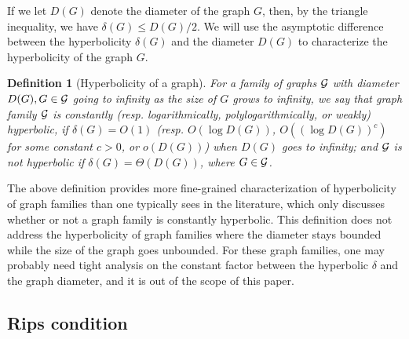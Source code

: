 \documentclass[11pt]{article}
\newtheorem{defi}{Definition}
\begin{document}
If we let $D(G)$ denote the diameter of the graph $G$, then, by the triangle 
inequality, we have $\delta(G) \le D(G)/2$.
We will use the asymptotic difference between the hyperbolicity $\delta(G)$ 
and the diameter $D(G)$ to characterize the hyperbolicity of the graph $G$.
\begin{defi}[Hyperbolicity of a graph]
For a family of graphs $\cal G$ with diameter $D(G), G\in {\cal G}$ going to infinity as the size of $G$ grows to infinity, we say 
that graph family $\cal G$ is
{\em constantly (resp. logarithmically, polylogarithmically, or weakly) hyperbolic}, 
	if $\delta(G) = O(1)$ (resp. $O(\log D(G))$, $O((\log D(G))^c)$ for some constant $c>0$, 
	or $o(D(G))$) when $D(G)$ goes to infinity; and 
	$\cal G$ is {\em not hyperbolic} if $\delta(G) = \Theta(D(G))$, where $G\in {\cal G}$.
\end{defi}


\noindent
The above definition provides more fine-grained characterization of hyperbolicity of graph families
	than one typically sees in the literature, which only discusses whether or not a graph family
	is constantly hyperbolic.
This definition does not address the hyperbolicity of graph families where the diameter 
	stays bounded while the size of the graph goes unbounded.
For these graph families, one may probably need tight analysis on the constant factor
	between the hyperbolic $\delta$ and the graph diameter, and it is out of the scope of this paper.
	



\subsection{Rips condition}
\end{document}
